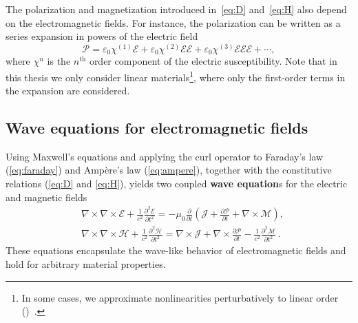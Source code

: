 The polarization and magnetization introduced in~\eqref{eq:D} and~\eqref{eq:H} also depend on the electromagnetic
fields. For instance, the
polarization can be written as a series expansion in powers of the electric
field
\begin{equation}\label{eq:polarization}
\bm{\mathcal{P}}=\mathcal{\varepsilon}_0 \bm{\mathcal{\chi}}^{(1)}
 \bm{\mathcal{E}}+\mathcal{\varepsilon}_0 \bm{\mathcal{\chi}}^{(2)}
 \bm{\mathcal{E}} \bm{\mathcal{E}}+\mathcal{\varepsilon}_0
 \bm{\mathcal{\chi}}^{(3)} \bm{\mathcal{E}} \bm{\mathcal{E}}
 \bm{\mathcal{E}}+\cdots,
\end{equation}
where $\bm{\mathcal{\chi}}^{n}$ is the $n^\text{th}$ order component of the
electric susceptibility. Note that in this thesis
we only consider linear materials\footnote{In some cases, we approximate nonlinearities perturbatively to linear
order ()~\cite{ownpub4}.}, where only the first-order terms in the expansion are
considered. \\

\subsection*{Wave equations for electromagnetic fields}

Using Maxwell's equations and applying the curl operator to Faraday's law
    (\eqref{eq:faraday}) and Ampère's law (\eqref{eq:ampere}),
together with the constitutive relations (\eqref{eq:D} and
        \eqref{eq:H}), yields two coupled
\textbf{wave equation}s for the electric and magnetic fields
\begin{equation}
    \begin{aligned}
         & \nabla \times \nabla \times \bm{\mathcal{E}}+\frac{1}{c^2}
        \frac{\partial^2 \bm{\mathcal{E}}}{\partial t^2}=-\mu_0
        \frac{\partial}{\partial t}\left(\bm{\mathcal{J}}+\frac{\partial
        \bm{\mathcal{P}}}{\partial t}+\nabla \times \bm{\mathcal{M}}\right), \\
         & \nabla \times \nabla \times \bm{\mathcal{H}}+\frac{1}{c^2}
        \frac{\partial^2 \bm{\mathcal{H}}}{\partial t^2}=\nabla \times
        \bm{\mathcal{J}}+\nabla \times \frac{\partial \bm{\mathcal{P}}}{\partial
            t}-\frac{1}{c^2} \frac{\partial^2 \bm{\mathcal{M}}}{\partial t^2}\,.
    \end{aligned}
\end{equation}
These
equations encapsulate the wave-like behavior of electromagnetic fields and
hold for arbitrary material properties.

